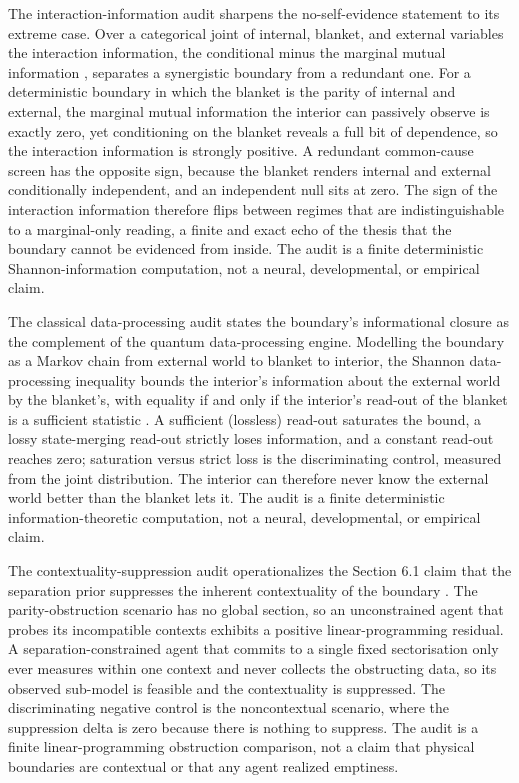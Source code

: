 \documentclass[
]{article}
\begin{document}
The interaction-information audit sharpens the no-self-evidence
statement to its extreme case. Over a categorical joint of internal,
blanket, and external variables the interaction information, the
conditional minus the marginal mutual information
\citep{mcgill1954multivariate, cover2006elements}, separates a
synergistic boundary from a redundant one. For a deterministic boundary
in which the blanket is the parity of internal and external, the
marginal mutual information the interior can passively observe is
exactly zero, yet conditioning on the blanket reveals a full bit of
dependence, so the interaction information is strongly positive. A
redundant common-cause screen has the opposite sign, because the blanket
renders internal and external conditionally independent, and an
independent null sits at zero. The sign of the interaction information
therefore flips between regimes that are indistinguishable to a
marginal-only reading, a finite and exact echo of the thesis that the
boundary cannot be evidenced from inside. The audit is a finite
deterministic Shannon-information computation, not a neural,
developmental, or empirical claim.

The classical data-processing audit states the boundary's informational
closure as the complement of the quantum data-processing engine.
Modelling the boundary as a Markov chain from external world to blanket
to interior, the Shannon data-processing inequality bounds the
interior's information about the external world by the blanket's, with
equality if and only if the interior's read-out of the blanket is a
sufficient statistic \citep{cover2006elements}. A sufficient (lossless)
read-out saturates the bound, a lossy state-merging read-out strictly
loses information, and a constant read-out reaches zero; saturation
versus strict loss is the discriminating control, measured from the
joint distribution. The interior can therefore never know the external
world better than the blanket lets it. The audit is a finite
deterministic information-theoretic computation, not a neural,
developmental, or empirical claim.

The contextuality-suppression audit operationalizes the Section 6.1
claim that the separation prior suppresses the inherent contextuality of
the boundary \citep{kochen1967problem}. The parity-obstruction scenario
has no global section, so an unconstrained agent that probes its
incompatible contexts exhibits a positive linear-programming residual. A
separation-constrained agent that commits to a single fixed
sectorisation only ever measures within one context and never collects
the obstructing data, so its observed sub-model is feasible and the
contextuality is suppressed. The discriminating negative control is the
noncontextual scenario, where the suppression delta is zero because
there is nothing to suppress. The audit is a finite linear-programming
obstruction comparison, not a claim that physical boundaries are
contextual or that any agent realized emptiness.
\end{document}
